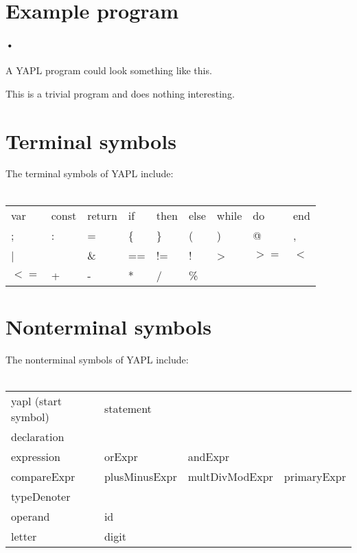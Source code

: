 \setlength{\grammarparsep}{10pt plus 1pt minus 1pt} %
\setlength{\grammarindent}{12em} %
\section{Example program}

\paragraph{•}
A YAPL program could look something like this.


This is a trivial program and does nothing interesting. 
\section{Terminal symbols}
The terminal symbols of YAPL include:\\\\
\begin{tabular}{lllllllll}
var		&	const	&	return	&	if	&	then	&	else	&	while	&	do		&	end 	\\
;		&	: 		& 	= 		& 	\{ 	& 	\} 		& 	( 		& 	) 		& 	@ 		& 	, 		\\ 
| 		& 	\		&	\& 		& 	== 	& 	!= 		& 	! 		& 	> 		& 	$>=$	& 	$<$ 	\\
$<=$	&	+ 		& 	- 		& 	* 	& 	/ 		& 	\% 	\\
\end{tabular}

\section{Nonterminal symbols}
The nonterminal symbols of YAPL include:\\\\
\begin{tabular}{llll}
yapl	 (start symbol)		&	statement		&					&		\\
declaration					&					&					&		\\
expression					&	orExpr			&	andExpr			&		\\
compareExpr					&	plusMinusExpr	&	multDivModExpr	&	primaryExpr	\\
typeDenoter					&					&					&		\\
operand						&	id				&					&		\\
letter						&	digit			&					&		\\
\end{tabular}

